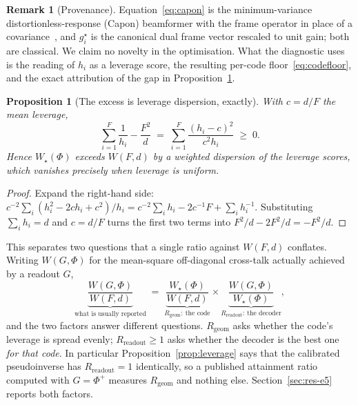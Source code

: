 \documentclass[preprint,12pt]{elsarticle}
\newtheorem{proposition}[theorem]{Proposition}
\theoremstyle{definition}
\newtheorem{remark}[theorem]{Remark}
\begin{document}
\begin{remark}[Provenance]
\label{rem:capon}
Equation~\eqref{eq:capon} is the minimum-variance distortionless-response (Capon) beamformer with
the frame operator in place of a covariance~\cite{capon1969}, and $g_i^{\star}$ is the canonical
dual frame vector rescaled to unit gain; both are classical. We claim no
novelty in the optimisation. What the diagnostic uses is the reading of $h_i$ as a leverage
score, the resulting per-code floor~\eqref{eq:codefloor}, and the exact attribution of the gap
in Proposition~\ref{prop:excess}.
\end{remark}

\begin{proposition}[The excess is leverage dispersion, exactly]
\label{prop:excess}
With $c=d/F$ the mean leverage,
\[
  \sum_{i=1}^{F}\frac1{h_i}-\frac{F^2}{d}\;=\;\sum_{i=1}^{F}\frac{(h_i-c)^2}{c^{2}h_i}\;\ge\;0 .
\]
Hence $W_{\star}(\Phi)$ exceeds $W(F,d)$ by a weighted dispersion of the leverage scores, which
vanishes precisely when leverage is uniform.
\end{proposition}

\begin{proof}
Expand the right-hand side: $c^{-2}\sum_i(h_i^2-2ch_i+c^2)/h_i
=c^{-2}\sum_ih_i-2c^{-1}F+\sum_ih_i^{-1}$. Substituting $\sum_ih_i=d$ and $c=d/F$ turns the
first two terms into $F^2/d-2F^2/d=-F^2/d$.
\end{proof}

This separates two questions that a single ratio against $W(F,d)$ conflates. Writing
$W(G,\Phi)$ for the mean-square off-diagonal cross-talk actually achieved by a readout $G$,
\begin{equation}
  \underbrace{\frac{W(G,\Phi)}{W(F,d)}}_{\text{what is usually reported}}
  \;=\;\underbrace{\frac{W_{\star}(\Phi)}{W(F,d)}}_{R_{\mathrm{geom}}:\ \text{the code}}
  \times
  \underbrace{\frac{W(G,\Phi)}{W_{\star}(\Phi)}}_{R_{\mathrm{readout}}:\ \text{the decoder}} ,
  \label{eq:decomposition}
\end{equation}
and the two factors answer different questions. $R_{\mathrm{geom}}$ asks whether the code's
leverage is spread evenly; $R_{\mathrm{readout}}\ge1$ asks whether the decoder is the best one
\emph{for that code}. In particular Proposition~\ref{prop:leverage} says that the calibrated
pseudoinverse has $R_{\mathrm{readout}}=1$ identically, so a published attainment ratio computed
with $G=\Phi^{+}$ measures $R_{\mathrm{geom}}$ and nothing else. Section~\ref{sec:res-e5} reports
both factors.
\end{document}
